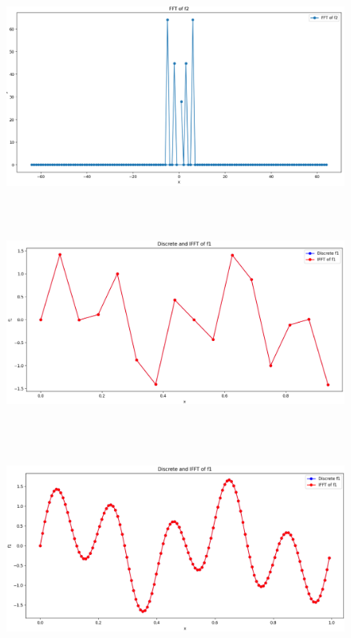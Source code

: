 \documentclass{ctexart}
\begin{document}
			\begin{figure}[H]
				\centering 
				\includegraphics[height=7cm,width=14cm]{2.png}
				\caption{}
			\end{figure}
				\begin{figure}[H]
					\centering 
					\includegraphics[height=7cm,width=14cm]{3.png}
					\caption{}
				\end{figure}
					\begin{figure}[H]
						\centering 
						\includegraphics[height=7cm,width=14cm]{4.png}
						\caption{}
					\end{figure}
\end{document}
